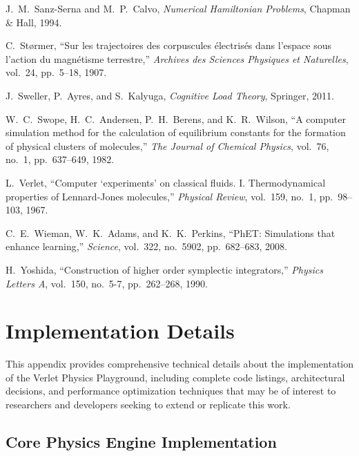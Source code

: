 \documentclass[12pt,journal,onecolumn]{IEEEtran}
\begin{document}
\begin{thebibliography}{99}
J.~M.~Sanz-Serna and M.~P.~Calvo, \emph{Numerical Hamiltonian Problems}, Chapman \& Hall, 1994.

C.~Størmer, ``Sur les trajectoires des corpuscules électrisés dans l'espace sous l'action du magnétisme terrestre,'' \emph{Archives des Sciences Physiques et Naturelles}, vol.~24, pp.~5--18, 1907.

J.~Sweller, P.~Ayres, and S.~Kalyuga, \emph{Cognitive Load Theory}, Springer, 2011.

W.~C.~Swope, H.~C.~Andersen, P.~H.~Berens, and K.~R.~Wilson, ``A computer simulation method for the calculation of equilibrium constants for the formation of physical clusters of molecules,'' \emph{The Journal of Chemical Physics}, vol.~76, no.~1, pp.~637--649, 1982.

L.~Verlet, ``Computer `experiments' on classical fluids. I. Thermodynamical properties of Lennard-Jones molecules,'' \emph{Physical Review}, vol.~159, no.~1, pp.~98--103, 1967.

C.~E.~Wieman, W.~K.~Adams, and K.~K.~Perkins, ``PhET: Simulations that enhance learning,'' \emph{Science}, vol.~322, no.~5902, pp.~682--683, 2008.

H.~Yoshida, ``Construction of higher order symplectic integrators,'' \emph{Physics Letters A}, vol.~150, no.~5-7, pp.~262--268, 1990.

\end{thebibliography}

\appendix

\section{Implementation Details}
\label{app:implementation}

This appendix provides comprehensive technical details about the implementation of the Verlet Physics Playground, including complete code listings, architectural decisions, and performance optimization techniques that may be of interest to researchers and developers seeking to extend or replicate this work.

\subsection{Core Physics Engine Implementation}
\label{app:physics-engine}
\end{document}
